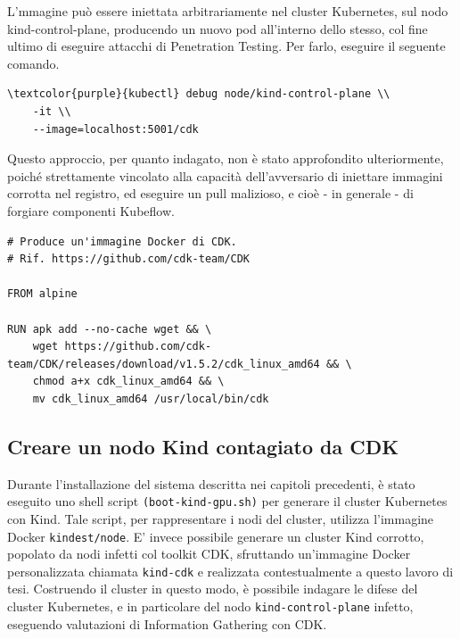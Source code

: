 L'mmagine può essere iniettata arbitrariamente nel cluster Kubernetes, sul nodo kind-control-plane, producendo un nuovo pod all'interno dello stesso, col fine ultimo di eseguire attacchi di Penetration Testing. Per farlo, eseguire il seguente comando.

\begin{small}
\begin{Verbatim}[commandchars=\\\{\}]
\textcolor{purple}{kubectl} debug node/kind-control-plane \\
    -it \\
    --image=localhost:5001/cdk
\end{Verbatim}
\end{small}

Questo approccio, per quanto indagato, non è stato approfondito ulteriormente, poiché strettamente vincolato alla capacità dell'avversario di iniettare immagini corrotta nel registro, ed eseguire un pull malizioso, e cioè - in generale - di forgiare componenti Kubeflow.

\begin{code}
\label{code:apx:a:dockerfile}
\begin{verbatim}
# Produce un'immagine Docker di CDK.
# Rif. https://github.com/cdk-team/CDK

FROM alpine

RUN apk add --no-cache wget && \
    wget https://github.com/cdk-team/CDK/releases/download/v1.5.2/cdk_linux_amd64 && \
    chmod a+x cdk_linux_amd64 && \
    mv cdk_linux_amd64 /usr/local/bin/cdk
\end{verbatim}
\end{code}

\subsection{Creare un nodo Kind contagiato da CDK}

Durante l'installazione del sistema descritta nei capitoli precedenti, è stato eseguito uno shell script {\small \verb|(boot-kind-gpu.sh)|} per generare il cluster Kubernetes con Kind. Tale script, per rappresentare i nodi del cluster, utilizza l'immagine Docker {\small \verb|kindest/node|}. E' invece possibile generare un cluster Kind corrotto, popolato da nodi infetti col toolkit CDK, sfruttando un'immagine Docker personalizzata chiamata {\small \verb|kind-cdk|} e realizzata contestualmente a questo lavoro di tesi. Costruendo il cluster in questo modo, è possibile indagare le difese del cluster Kubernetes, e in particolare del nodo {\small \verb|kind-control-plane|} infetto, eseguendo valutazioni di Information Gathering con CDK.

